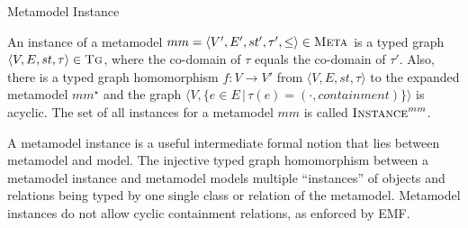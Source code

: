 

\begin{definition}{Metamodel Instance\\}
\label{def:metamodelinstance}

An instance of a metamodel $mm = \langle V',E',st',\tau',\leq\rangle\in \textsc{Meta}$ is a typed graph $\langle V,E,st,\tau\rangle\in \textsc{Tg}$, where the co-domain of $\tau$ equals the co-domain of $\tau'$. Also, there is a typed graph homomorphism $f:V\rightarrow V'$ from $\langle V,E,st,\tau\rangle$ to the expanded metamodel $mm^{\star}$ and the graph $\big\langle V,\{e\in E\,|\,\tau(e)=(\cdot,containment)\}\big\rangle$ is acyclic. The set of all instances for a metamodel $mm$ is called $\textsc{Instance}^{mm}$.

\end{definition}



A metamodel instance is a useful intermediate formal notion that lies between metamodel and model. The injective typed graph homomorphism between a metamodel instance and metamodel models multiple ``instances'' of objects and relations being typed by one single class or relation of the metamodel. Metamodel instances do not allow cyclic containment relations, as enforced by EMF. 




